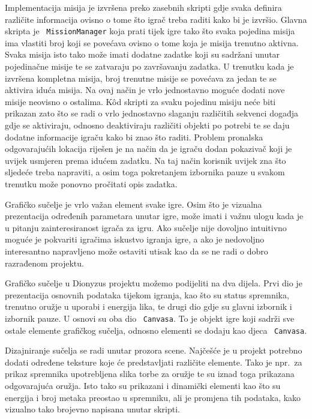 Implementacija misija je izvršena preko zasebnih skripti gdje svaka definira
različite informacija ovisno o tome što igrač treba raditi kako bi je izvršio.
Glavna skripta je ~\texttt{MissionManager} koja prati tijek igre tako što svaka pojedina
misija ima vlastiti broj koji se povećava ovisno o tome koja je misija trenutno
aktivna. Svaka misija isto tako može imati dodatne zadatke koji su sadržani unutar
pojedinačne misije te se zatvaraju po završavanju zadatka. U trenutku kada je
izvršena kompletna misija, broj trenutne misije se povećava za jedan te se aktivira
iduća misija. Na ovaj način je vrlo jednostavno moguće dodati nove misije neovisno o
ostalima. K\^od skripti za svaku pojedinu misiju neće biti prikazan zato što se radi
o vrlo jednostavno slaganju različitih sekvenci događja gdje se aktiviraju, odnosno
deaktiviraju različiti objekti po potrebi te se daju dodatne informacije igraču kako
bi znao što raditi. Problem pronalska odgovarajućih lokacija riješen je na način da
je igraču dodan pokazivač koji je uvijek usmjeren prema idućem zadatku. Na taj način
korisnik uvijek zna što sljedeće treba napraviti, a osim toga pokretanjem izbornika
pauze u svakom trenutku može ponovno pročitati opis zadatka.

Grafičko sučelje je vrlo važan element svake igre. Osim što je vizualna prezentacija
određenih parametara unutar igre, može imati i važnu ulogu kada je u pitanju
zainteresiranost igrača za igru. Ako sučelje nije dovoljno intuitivno moguće je
pokvariti igračima iskustvo igranja igre, a ako je nedovoljno interesantno
napravljeno može ostaviti utisak kao da se ne radi o dobro razrađenom projektu.

Grafičko sučelje u Dionyzus projektu možemo podijeliti na dva dijela. Prvi dio je
prezentacija osnovnih podataka tijekom igranja, kao što su status spremnika,
trenutno oružje u uporabi i energija lika, te drugi dio gdje su glavni izbornik i
izbornik pauze. U osnovi su oba dio ~\texttt{Canvasa}. To je objekt igre koji sadrži sve
ostale elemente grafičkog sučelja, odnosno elementi se dodaju kao djeca ~\texttt{Canvasa}. 

Dizajniranje sučelja se radi unutar prozora scene. Najčešće je u projekt potrebno
dodati određene teksture koje će predstavljati različite elemente. Tako je npr.~za
prikaz spremnika upotrebljena slika torbe za oružje te su iznad toga prikazana
odgovarajuća oružja. Isto tako su prikazani i dinamički elementi kao što su energija
i broj metaka preostao u spremniku, ali je promjena tih podataka, kako vizualno tako
brojevno napisana unutar skripti. 

